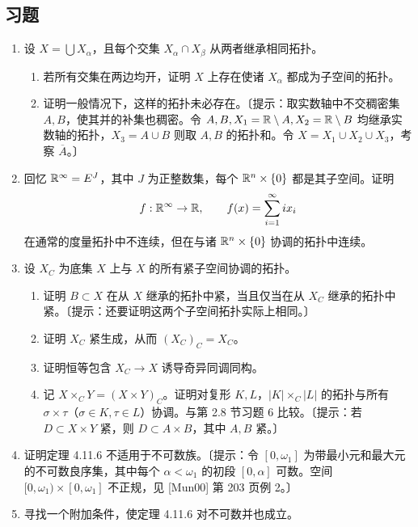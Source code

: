 \subsection*{习题}
\begin{enumerate}
\item 设 $X=\bigcup X_\alpha$，且每个交集 $X_\alpha\cap X_\beta$ 从两者继承相同拓扑。
\begin{enumerate}[label=(\alph*)]
\item 若所有交集在两边均开，证明 $X$ 上存在使诸 $X_\alpha$ 都成为子空间的拓扑。
\item 证明一般情况下，这样的拓扑未必存在。〔提示：取实数轴中不交稠密集 $A,B$，使其并的补集也稠密。令 $A,B,X_1=\mathbb{R}\setminus A,X_2=\mathbb{R}\setminus B$ 均继承实数轴的拓扑，$X_3=A\cup B$ 则取 $A,B$ 的拓扑和。令 $X=X_1\cup X_2\cup X_3$，考察 $\overline A$。〕
\end{enumerate}
\item 回忆 $\mathbb{R}^\infty=E^J$，其中 $J$ 为正整数集，每个 $\mathbb{R}^n\times\{0\}$ 都是其子空间。证明
\[
f:\mathbb{R}^\infty\to\mathbb{R},\qquad f(x)=\sum_{i=1}^{\infty}ix_i
\]
在通常的度量拓扑中不连续，但在与诸 $\mathbb{R}^n\times\{0\}$ 协调的拓扑中连续。
\item 设 $X_C$ 为底集 $X$ 上与 $X$ 的所有紧子空间协调的拓扑。
\begin{enumerate}[label=(\alph*)]
\item 证明 $B\subset X$ 在从 $X$ 继承的拓扑中紧，当且仅当在从 $X_C$ 继承的拓扑中紧。〔提示：还要证明这两个子空间拓扑实际上相同。〕
\item 证明 $X_C$ 紧生成，从而 $(X_C)_C=X_C$。
\item 证明恒等包含 $X_C\to X$ 诱导奇异同调同构。
\item 记 $X\times_CY=(X\times Y)_C$。证明对复形 $K,L$，$|K|\times_C|L|$ 的拓扑与所有 $\sigma\times\tau$（$\sigma\in K,\tau\in L$）协调。与第 2.8 节习题 6 比较。〔提示：若 $D\subset X\times Y$ 紧，则 $D\subset A\times B$，其中 $A,B$ 紧。〕
\end{enumerate}
\item 证明定理 4.11.6 不适用于不可数族。〔提示：令 $[0,\omega_1]$ 为带最小元和最大元的不可数良序集，其中每个 $\alpha<\omega_1$ 的初段 $[0,\alpha]$ 可数。空间 $[0,\omega_1)\times[0,\omega_1]$ 不正规，见 [Mun00] 第 203 页例 2。〕
\item 寻找一个附加条件，使定理 4.11.6 对不可数并也成立。
\end{enumerate}
